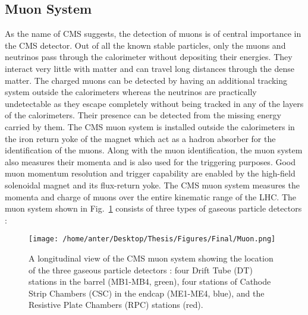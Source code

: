 \subsection{Muon System}
As the name of CMS suggests, the detection of muons is of central importance in the CMS detector. Out of all the known stable particles, only the muons and neutrinos pass through the calorimeter without depositing their energies. They interact very little with matter and can travel long distances through the dense matter. The charged muons can be detected by having an additional tracking system outside the calorimeters whereas the neutrinos are practically undetectable as they escape completely without being tracked in any of the layers of the calorimeters. Their presence can be detected from the missing energy carried by them. The CMS muon system is installed outside the calorimeters in the iron return yoke of the magnet which act as a hadron absorber for the identification of the muons. Along with the muon identification, the muon system also measures their momenta and is also used for the triggering purposes. Good muon momentum resolution and trigger capability are enabled by the high-field solenoidal magnet and its flux-return yoke. The CMS muon system measures the momenta and charge of muons over the entire kinematic range of the LHC. The muon system shown in Fig.~\ref{fig:muon} consists of three types of gaseous particle detectors : \\ \newline
\begin{figure}[!t]
\begin{center}
\vspace*{3mm} 
\hspace*{-5mm}
\texttt{[image: /home/anter/Desktop/Thesis/Figures/Final/Muon.png]}\\
\vspace*{4mm}
\caption[A longitudinal view of the CMS muon system showing the location of the three gaseous particle detectors.]{A longitudinal view of the CMS muon system showing the location of the three gaseous particle detectors : four Drift Tube (DT) stations in the barrel (MB1-MB4, green), four stations of Cathode Strip Chambers (CSC) in the endcap (ME1-ME4, blue), and the Resistive Plate Chambers (RPC) stations (red)\footnotemark.}
\label{fig:muon}
\end{center}
\end{figure}
